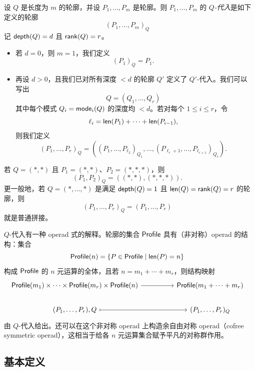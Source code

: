 \begin{definition}\label{definitionofPconcatenation}
    设 $Q$ 是长度为 $m$ 的轮廓，并设 $P_1,\dots,P_m$ 是轮廓。则 $P_1,\dots,P_m$ 的 $Q${\it -代入}是如下定义的轮廓
    \[
    (P_1,\dots,P_m)_Q
    \]
    记 $\mathsf{depth}(Q) = d$ 且 $\mathsf{rank}(Q) = r$。
    \begin{itemize}[left = 0pt]
        \item 若 $d = 0$，则 $m = 1$，我们定义
        \[
        (P_1)_Q = P_1.
        \]
        \item 再设 $d > 0$，且我们已对所有深度 $<d$ 的轮廓 $Q'$ 定义了 $Q'$-代入。我们可以写出
    \[
    Q = (Q_1,\dots, Q_r)
    \]
    其中每个模式 $Q_i = \mathsf{mode}_i(Q)$ 的深度均 $< d$。若对每个 $1 \leq i \leq r$，令
    \[\ell_i = \mathsf{len}(P_1) + \cdots + \mathsf{len}(P_{i-1}),\] 
    则我们定义
    \[
    (P_1,\dots,P_r)_Q = ((P_{1},\dots,P_{\ell_2})_{Q_1},\dots,(P_{\ell_r +1},\dots,P_{\ell_{r+1}})_{Q_r}).
    \]
    \end{itemize}
\end{definition}

\begin{example}
    若 $Q = (*,*)$ 且 $P_1 = (*,*)$、$P_2 = (*,*,*)$，则
    \[
    (P_1,P_2)_Q = ( (*,*), (*,*,*)).
    \]
    更一般地，若 $Q = (*,\dots,*)$ 是满足 $\mathsf{depth}(Q) = 1$ 且 $\mathsf{len}(Q) = \mathsf{rank}(Q) = r$ 的轮廓，则
    \[
    (P_1,\dots,P_r)_Q = (P_1,\dots,P_r)
    \]
    就是普通拼接。
\end{example}


\begin{aside}
    $Q$-代入有一种 operad 式的解释。轮廓的集合 $\mathsf{Profile}$ 具有（非对称）operad 的结构：集合
    \[
    \mathsf{Profile}(n) = \{P \in \mathsf{Profile} \mid \mathsf{len}(P) = n\}
    \]
    构成 $\mathsf{Profile}$ 的 $n$ 元运算的全体，且若 $n = m_1 + \cdots + m_r$，则结构映射
    \[ \begin{tikzcd} 
     \mathterm{Profile}(m_1)\times \dots \times \mathterm{Profile}(m_r) \times \mathterm{Profile}(n) \ar[rr] & &  \mathterm{Profile}(m_1 + \cdots + m_r)\\
    (P_1,\dots,P_r),Q \ar[rr,mapsto] & & (P_1,\dots,P_r)_Q
    \end{tikzcd}\]
    由 $Q$-代入给出。还可以在这个非对称 operad 上构造余自由对称 operad（cofree symmetric operad），这相当于给各 $n$ 元运算集合赋予平凡的对称群作用。
\end{aside}




\subsection{基本定义}

